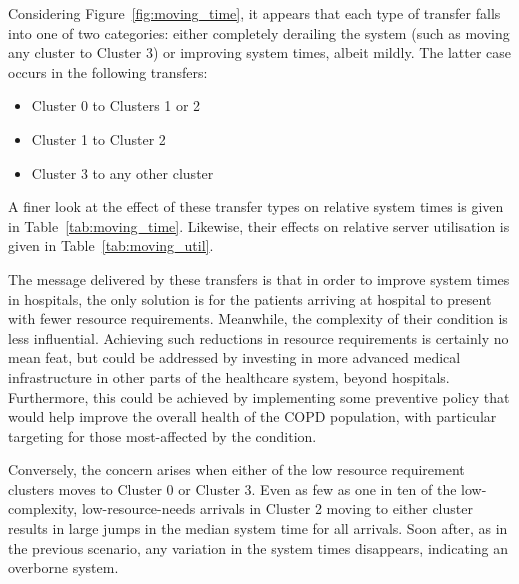 Considering Figure~\ref{fig:moving_time}, it appears that each type of transfer
falls into one of two categories: either completely derailing the system (such
as moving any cluster to Cluster 3) or improving system times, albeit mildly. 
The latter case occurs in the following transfers:

\begin{itemize}
    \item Cluster 0 to Clusters 1 or 2
    \item Cluster 1 to Cluster 2
    \item Cluster 3 to any other cluster
\end{itemize}

A finer look at the effect of these transfer types on relative system times is
given in Table~\ref{tab:moving_time}. Likewise, their effects on relative server
utilisation is given in Table~\ref{tab:moving_util}. 

\begin{table}
    \centering%
    \resizebox{\textwidth}{!}{%
        
    }
    \caption{%
        Proportional changes in median relative system time for selected cluster
        transfers
    }\label{tab:moving_time}
\end{table}

\begin{table}
    \centering%
    \resizebox{\textwidth}{!}{%
        
    }
    \caption{%
        Proportional changes in median relative utilisation for selected cluster
        transfers
    }\label{tab:moving_util}
\end{table}

The message delivered by these transfers is that in order to improve system
times in hospitals, the only solution is for the patients arriving at hospital
to present with fewer resource requirements. Meanwhile, the complexity of their
condition is less influential. Achieving such reductions in resource
requirements is certainly no mean feat, but could be addressed by investing in
more advanced medical infrastructure in other parts of the healthcare system,
beyond hospitals. Furthermore, this could be achieved by implementing some
preventive policy that would help improve the overall health of the COPD
population, with particular targeting for those most-affected by the condition.

Conversely, the concern arises when either of the low resource requirement
clusters moves to Cluster 0 or Cluster 3. Even as few as one in ten of the
low-complexity, low-resource-needs arrivals in Cluster 2 moving to either
cluster results in large jumps in the median system time for all arrivals. Soon
after, as in the previous scenario, any variation in the system times
disappears, indicating an overborne system.

